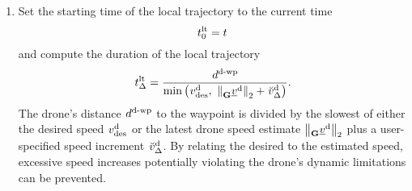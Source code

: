 \begin{enumerate}
    \item Set the starting time of the local trajectory to the current time
    \begin{equation}
        \timepnt[]{\loctraj}{0}{}{} = t
    \end{equation}
    and compute the duration of the local trajectory 
    \begin{equation}
        \dur[]{\loctraj}{}{}{}
        = 
        \frac{
            \dist[]{\dronetowayp}{}{}{}
        }{
            \minof{
            \speed[]{\drone}{\desired}{}{}
            }{
                \left\|
                    \vel[]{\drone}{}{\grs}{}
                \right\|_2
                + 
                \speed[\user]{\drone}{\Delta}{}{}
            }
        }.
    \end{equation}
    The drone's distance 
    $\dist[]{\dronetowayp}{}{}{}$
    to the waypoint is divided 
    by the slowest of either the desired speed
    $\speed[]{\drone}{\desired}{}{}$
    or the latest drone speed estimate
    $\left\|\vel[]{\drone}{}{\grs}{}\right\|_2$
    plus a user-specified speed increment
    $\speed[\user]{\drone}{\Delta}{}{}$.
    By relating the desired to the estimated speed,
    excessive speed increases
    potentially violating the drone's dynamic limitations
    can be prevented.


\end{enumerate}
